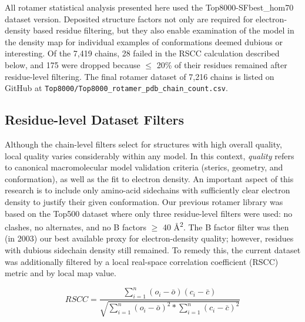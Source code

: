 All rotamer statistical analysis presented here used the Top8000-SFbest\_hom70 dataset version. Deposited structure factors not only are required for electron-density based residue filtering, but they also enable examination of the model in the density map for individual examples of conformations deemed dubious or interesting. Of the 7,419 chains, 28 failed in the RSCC calculation described below, and 175 were dropped because $\le$ 20\% of their residues remained after residue-level filtering. The final rotamer dataset of 7,216 chains is listed on GitHub at \texttt{Top8000/Top8000\_rotamer\_pdb\_chain\_count.csv}.


\subsection{Residue-level Dataset Filters}
\label{sec:resfilters}
Although the chain-level filters select for structures with high overall quality, local quality varies considerably within any model. In this context, \emph{quality} refers to canonical macromolecular model validation criteria (sterics, geometry, and conformation), as well as the fit to electron density. An important aspect of this research is to include only amino-acid sidechains with sufficiently clear electron density to justify their given conformation. Our previous rotamer library was based on the Top500 dataset where only three residue-level filters were used: no clashes, no alternates, and no B factors $\ge$ 40 \AA\textsuperscript{2}. The B factor filter was then (in 2003) our best available proxy for electron-density quality; however, residues with dubious sidechain density still remained. To remedy this, the current dataset was additionally filtered by a local real-space correlation coefficient (RSCC) metric \textcolor{changecolor}{\cite{Kleywegt:ba5061}} and by local map value.

\begin{equation}
RSCC = \frac{\sum_{i=1}^{n} \left ( o_{i} - \bar{o} \right )\left ( c_{i} - \bar{c} \right )}{\sqrt{\sum_{i=1}^{n} \left ( o_{i} - \bar{o} \right )^{2} \ast \sum_{i=1}^{n}\left ( c_{i} - \bar{c} \right )^{2}}}
\label{rscceq}
\end{equation}

